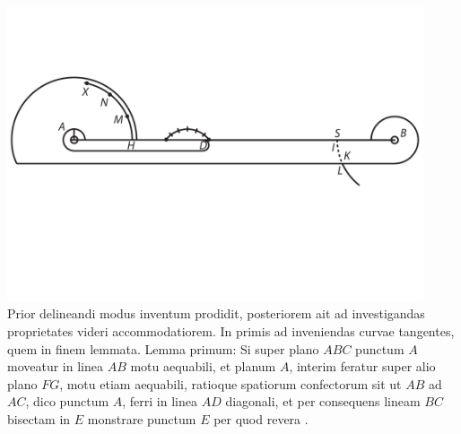 \pend 
\pstart {}%
{}
\pend 
\vspace{1.5em}
\pstart
\centering
\includegraphics[width=0.92\textwidth]{images/LH03705_216r-d3.pdf}\\
\pend
\vspace{1.5em}
\pstart Prior delineandi modus inventum prodidit, posteriorem ait ad investigandas proprietates videri accommodatiorem. In primis ad inveniendas curvae tangentes, quem in finem lemmata. Lemma primum: Si super plano $ABC$ punctum $A$ moveatur in linea $AB$ motu aequabili, et planum $A$, interim feratur super alio plano $FG$, motu etiam aequabili, ratioque spatiorum confectorum sit ut $AB$ ad $AC$, dico punctum $A$, ferri in linea $AD$ diagonali, et per consequens lineam $BC$ bisectam in $E$ monstrare punctum $E$ per quod revera . 
\pend 
\newpage
\pstart
\noindent
\hspace{4mm}
